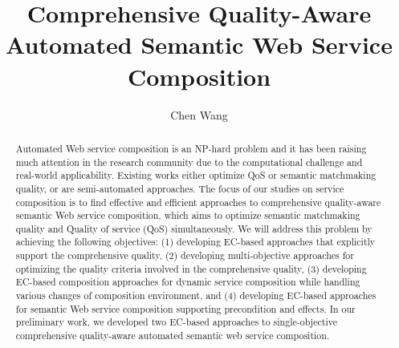 \documentclass[11pt
              , a4paper
              , twoside
              , openright
              ]{report}
\title{Comprehensive Quality-Aware Automated Semantic Web Service Composition}
\author{Chen Wang}
\begin{document}
\frontmatter


\begin{abstract}
\small{Automated Web service composition is an NP-hard problem and it has been raising much attention in the research community due to the computational challenge and real-world applicability. Existing works either optimize QoS or semantic matchmaking quality, or are semi-automated approaches. The focus of our studies on service composition is to find effective and efficient approaches to comprehensive quality-aware semantic Web service composition, which aims to optimize semantic matchmaking quality and Quality of service (QoS) simultaneously. We will address this problem by achieving the following objectives: (1) developing EC-based approaches that explicitly support the comprehensive quality, (2) developing multi-objective approaches for optimizing the quality criteria involved in the comprehensive quality, (3) developing EC-based  composition approaches for dynamic service composition while handling various changes of composition environment, and  (4) developing EC-based approaches for semantic Web service composition supporting precondition and effects. In our preliminary work, we developed two EC-based approaches to single-objective comprehensive quality-aware automated semantic web service composition.}
\end{abstract}


\maketitle

%

\tableofcontents



\mainmatter








\backmatter





\end{document}
